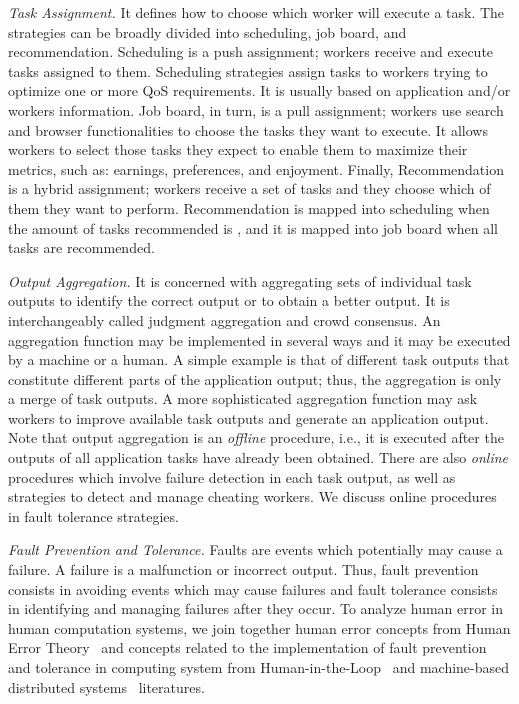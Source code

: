 \documentclass[11pt]{bmc_article_s50}
\begin{document}
\textit{Task Assignment.} It defines how to choose which worker will execute a task. The strategies can be broadly divided into scheduling, job board, and recommendation. Scheduling is a push assignment; workers receive and execute tasks assigned to them. Scheduling strategies assign tasks to workers trying to optimize one or more QoS requirements. It is usually based on application and/or workers information. Job board, in turn, is a pull assignment; workers use search and browser functionalities to choose the tasks they want to execute. It allows workers to select those tasks they expect to enable them to maximize their metrics, such as: earnings, preferences, and enjoyment. Finally, Recommendation is a hybrid assignment; workers receive a set of tasks and they choose which of them they want to perform. Recommendation is mapped into scheduling when the amount of tasks recommended is , and it is mapped into job board when all tasks are recommended.

\textit{Output Aggregation.} It is concerned with aggregating sets of individual task outputs to identify the correct output or to obtain a better output. It is interchangeably called judgment aggregation and crowd consensus. An aggregation function may be implemented in several ways and it may be executed by a machine or a human. A simple example is that of different task outputs that constitute different parts of the application output; thus, the aggregation is only a merge of task outputs. A more sophisticated aggregation function may ask workers to improve available task outputs and generate an application output. Note that output aggregation is an \textit{offline} procedure, i.e., it is executed after the outputs of all application tasks have already been obtained. There are also \textit{online} procedures which involve failure detection in each task output, as well as strategies to detect and manage cheating workers. We discuss online procedures in fault tolerance strategies.

\textit{Fault Prevention and Tolerance.} Faults are events which potentially may cause a failure. A failure is a malfunction or incorrect output. Thus, fault prevention consists in avoiding events which may cause failures and fault tolerance consists in identifying and managing failures after they occur. To analyze human error in human computation systems, we join together human error concepts from Human Error Theory~\cite{James:HumanError:1990} and concepts related to the implementation of fault prevention and tolerance in computing system from Human-in-the-Loop~\cite{Cranor:UPSEC:2008} and machine-based distributed systems~\cite{Jalote:FTD:1994} literatures.
\end{document}
